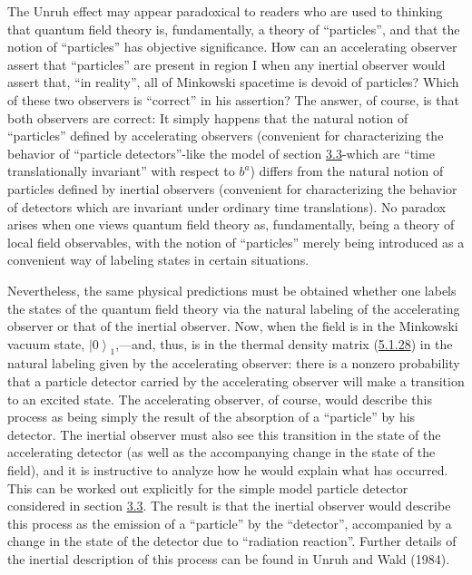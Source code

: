 \documentclass[11pt,a4paper]{article}
\providecommand{\ket}[1]{\left\lvert#1\right\rangle}
\begin{document}
The Unruh effect may appear paradoxical to readers who are used to thinking that quantum field theory is, fundamentally, a theory of ``particles'', and that the notion of ``particles'' has objective significance. How can an accelerating observer assert that ``particles'' are present in region I when any inertial observer would assert that, ``in reality'', all of Minkowski spacetime is devoid of particles? Which of these two observers is ``correct'' in his assertion? The answer, of course, is that both observers are correct: It simply happens that the natural notion of ``particles'' defined by accelerating observers (convenient for characterizing the behavior of ``particle detectors''-like the model of section \hyperlink{sec:3.3}{3.3}-which are ``time translationally invariant'' with respect to \(b^a\)) differs from the natural notion of particles defined by inertial observers (convenient for characterizing the behavior of detectors which are invariant under ordinary time translations). No paradox arises when one views quantum field theory as, fundamentally, being a theory of local field observables, with the notion of ``particles'' merely being introduced as a convenient way of labeling states in certain situations.

Nevertheless, the same physical predictions must be obtained whether one labels the states of the quantum field theory via the natural labeling of the accelerating observer or that of the inertial observer. Now, when the field is in the Minkowski vacuum state, \(\ket{0}_1\),---and, thus, is in the thermal density matrix (\hyperref[eq:5.1.28]{5.1.28}) in the natural labeling given by the accelerating observer: there is a nonzero probability that a particle detector carried by the accelerating observer will make a transition to an excited state. The accelerating observer, of course, would describe this process as being simply the result of the absorption of a ``particle'' by his detector. The inertial observer must also see this transition in the state of the accelerating detector (as well as the accompanying change in the state of the field), and it is instructive to analyze how he would explain what has occurred. This can be worked out explicitly for the simple model particle detector considered in section \hyperlink{sec:3.3}{3.3}. The result is that the inertial observer would describe this process as the emission of a ``particle'' by the ``detector'', accompanied by a change in the state of the detector due to ``radiation reaction''. Further details of the inertial description of this process can be found in Unruh and Wald (1984).
\end{document}
